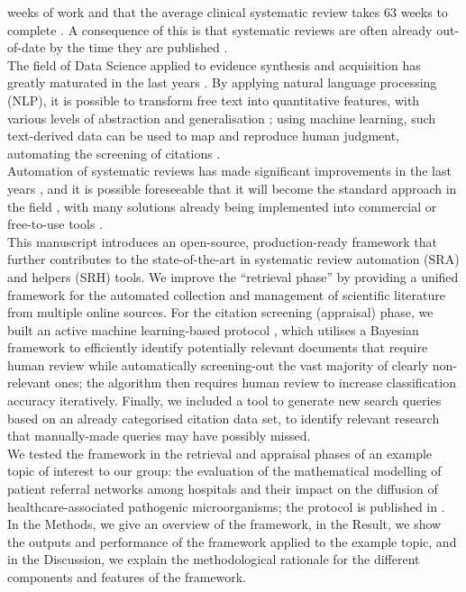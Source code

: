\documentclass[]{bmcart}
\begin{document}
weeks of work and that the average clinical systematic review takes 63
weeks to complete
\citep{bannach2019machine, borah2017analysis, allen1999estimating}. A
consequence of this is that systematic reviews are often already
out-of-date by the time they are published
\citep{beller2013systematic}.\\
The field of Data Science applied to evidence synthesis and acquisition
has greatly maturated in the last years
\citep{marshall2015systematic, beller2018making, tsafnat2014systematic}.
By applying natural language processing (NLP), it is possible to
transform free text into quantitative features, with various levels of
abstraction and generalisation
\citep{ananiadou2006text, cohen2008getting}; using machine learning,
such text-derived data can be used to map and reproduce human judgment,
automating the screening of citations \citep{ikonomakis2005text}.\\
Automation of systematic reviews has made significant improvements in
the last years
\citep{ananiadou2009supporting, o2015using, tsafnat2013automation, jonnalagadda2015automating},
and it is possible foreseeable that it will become the standard approach
in the field \citep{beller2018making}, with many solutions already being
implemented into commercial or free-to-use tools \citep[see][table
1]{marshall2015systematic}.\\
This manuscript introduces an open-source, production-ready framework
that further contributes to the state-of-the-art in systematic review
automation (SRA) and helpers (SRH) tools. We improve the ``retrieval
phase'' by providing a unified framework for the automated collection
and management of scientific literature from multiple online sources.
For the citation screening (appraisal) phase, we built an active machine
learning-based protocol \citep{settles2009active, miwa2014reducing},
which utilises a Bayesian framework to efficiently identify potentially
relevant documents that require human review while automatically
screening-out the vast majority of clearly non-relevant ones; the
algorithm then requires human review to increase classification accuracy
iteratively. Finally, we included a tool to generate new search queries
based on an already categorised citation data set, to identify relevant
research that manually-made queries may have possibly missed.\\
We tested the framework in the retrieval and appraisal phases of an
example topic of interest to our group: the evaluation of the
mathematical modelling of patient referral networks among hospitals and
their impact on the diffusion of healthcare-associated pathogenic
microorganisms; the protocol is published in \citep{newis}.\\
In the Methods, we give an overview of the framework, in the Result, we
show the outputs and performance of the framework applied to the example
topic, and in the Discussion, we explain the methodological rationale
for the different components and features of the framework.\\
\end{document}
